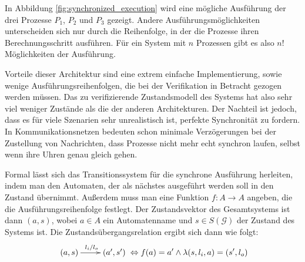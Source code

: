 In Abbildung \ref{fig:synchronized_execution} wird eine mögliche Ausführung der drei Prozesse $P_1$, $P_2$ und $P_3$ gezeigt.
Andere Ausführungsmöglichkeiten unterscheiden sich nur durch die Reihenfolge, in der die Prozesse ihren Berechnungsschritt ausführen.
Für ein System mit $n$ Prozessen gibt es also $n!$ Möglichkeiten der Ausführung.

Vorteile dieser Architektur sind eine extrem einfache Implementierung, sowie wenige Ausführungsreihenfolgen, die bei der Verifikation in Betracht gezogen werden müssen.
Das zu verifizierende Zustandsmodell des Systems hat also sehr viel weniger Zustände als die der anderen Architekturen.
Der Nachteil ist jedoch, dass es für viele Szenarien sehr unrealistisch ist, perfekte Synchronität zu fordern.
In Kommunikationsnetzen bedeuten schon minimale Verzögerungen bei der Zustellung von Nachrichten, dass Prozesse nicht mehr echt synchron laufen, selbst wenn ihre Uhren genau gleich gehen.

Formal lässt sich das Transitionssystem für die synchrone Ausführung herleiten, indem man den Automaten, der als nächstes ausgeführt werden soll in den Zustand übernimmt.
Außerdem muss man eine Funktion $f : A\rightarrow A$ angeben, die die Ausführungsreihenfolge festlegt.
Der Zustandsvektor des Gesamtsystems ist dann $(a,s)$, wobei $a\in A$ ein Automatenname und $s\in S(\mathcal{G})$ der Zustand des Systems ist.
Die Zustandsübergangsrelation ergibt sich dann wie folgt:
\[ \xymatrix { (a,s) \ar[r]^{l_i/l_o} & (a',s') } \Leftrightarrow f(a)=a'\land \lambda(s,l_i,a) = (s',l_o) \]

